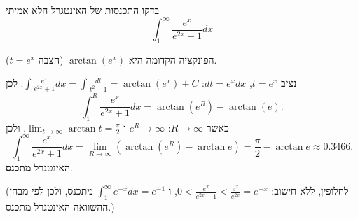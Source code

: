 
\begin{question}
בדקו התכנסות של האינטגרל הלא אמיתי
\[ \int_1^\infty\frac{e^x}{e^{2x}+1}dx \]
\end{question}

\begin{hint}
הפונקציה הקדומה היא $\arctan(e^x)$ (הצבה $t=e^x$).
\end{hint}

\begin{solution}
נציב $t=e^x$, $dt=e^xdx$: $\int\frac{e^x}{e^{2x}+1}dx=\int\frac{dt}{t^2+1}=\arctan(e^x)+C$. לכן
\[ \int_1^R\frac{e^x}{e^{2x}+1}dx=\arctan(e^R)-\arctan(e). \]
כאשר $R\to\infty$: $e^R\to\infty$ ו-$\lim_{t\to\infty}\arctan t=\frac\pi2$, ולכן
\[ \int_1^\infty\frac{e^x}{e^{2x}+1}dx=\lim_{R\to\infty}\left(\arctan(e^R)-\arctan e\right)=\boxed{\frac\pi2-\arctan e}\approx0.3466. \]
האינטגרל \textbf{מתכנס}.

(לחלופין, ללא חישוב: $0<\frac{e^x}{e^{2x}+1}<\frac{e^x}{e^{2x}}=e^{-x}$, ו-$\int_1^\infty e^{-x}dx=e^{-1}$ מתכנס, ולכן לפי מבחן ההשוואה האינטגרל מתכנס.)
\end{solution}

